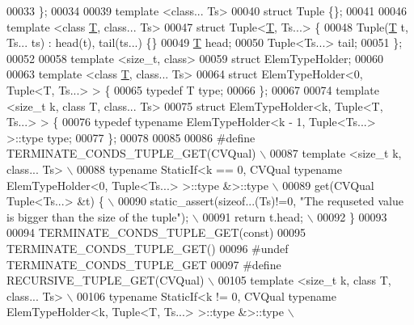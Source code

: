 \begin{DoxyCode}
00033 \};
00034 
00039 \textcolor{keyword}{template} <\textcolor{keyword}{class}... Ts>
00040 \textcolor{keyword}{struct }Tuple \{\};
00041 
00046 \textcolor{keyword}{template} <\textcolor{keyword}{class }\hyperlink{group___sparse_core___module_class_eigen_1_1_triplet}{T}, \textcolor{keyword}{class}... Ts>
00047 \textcolor{keyword}{struct }Tuple<\hyperlink{group___sparse_core___module_class_eigen_1_1_triplet}{T}, Ts...> \{
00048   Tuple(\hyperlink{group___sparse_core___module_class_eigen_1_1_triplet}{T} t, Ts... ts) : head(t), tail(ts...) \{\}
00049   \hyperlink{group___sparse_core___module_class_eigen_1_1_triplet}{T} head;
00050   Tuple<Ts...> tail;
00051 \};
00052 
00058 \textcolor{keyword}{template} <\textcolor{keywordtype}{size\_t}, \textcolor{keyword}{class}>
00059 \textcolor{keyword}{struct }ElemTypeHolder;
00060 
00063 \textcolor{keyword}{template} <\textcolor{keyword}{class }\hyperlink{group___sparse_core___module_class_eigen_1_1_triplet}{T}, \textcolor{keyword}{class}... Ts>
00064 \textcolor{keyword}{struct }ElemTypeHolder<0, Tuple<T, Ts...> > \{
00065   \textcolor{keyword}{typedef} T type;
00066 \};
00067 
00074 \textcolor{keyword}{template} <\textcolor{keywordtype}{size\_t} k, \textcolor{keyword}{class }T, \textcolor{keyword}{class}... Ts>
00075 \textcolor{keyword}{struct }ElemTypeHolder<k, Tuple<T, Ts...> > \{
00076   \textcolor{keyword}{typedef} \textcolor{keyword}{typename} ElemTypeHolder<k - 1, Tuple<Ts...> >::type type;
00077 \};
00078 
00085 
00086 \textcolor{preprocessor}{#define TERMINATE\_CONDS\_TUPLE\_GET(CVQual) \(\backslash\)}
00087 \textcolor{preprocessor}{template <size\_t k, class... Ts> \(\backslash\)}
00088 \textcolor{preprocessor}{typename StaticIf<k == 0, CVQual typename ElemTypeHolder<0, Tuple<Ts...> >::type &>::type \(\backslash\)}
00089 \textcolor{preprocessor}{get(CVQual Tuple<Ts...> &t) \{ \(\backslash\)}
00090 \textcolor{preprocessor}{  static\_assert(sizeof...(Ts)!=0, "The requseted value is bigger than the size of the tuple"); \(\backslash\)}
00091 \textcolor{preprocessor}{  return t.head; \(\backslash\)}
00092 \textcolor{preprocessor}{\}}
00093 
00094 TERMINATE\_CONDS\_TUPLE\_GET(\textcolor{keyword}{const})
00095 TERMINATE\_CONDS\_TUPLE\_GET()
00096 \textcolor{preprocessor}{#undef TERMINATE\_CONDS\_TUPLE\_GET}
00097 \textcolor{preprocessor}{#define RECURSIVE\_TUPLE\_GET(CVQual) \(\backslash\)}
00105 \textcolor{preprocessor}{template <size\_t k, class T, class... Ts> \(\backslash\)}
00106 \textcolor{preprocessor}{typename StaticIf<k != 0, CVQual typename ElemTypeHolder<k, Tuple<T, Ts...> >::type &>::type \(\backslash\)}

\end{DoxyCode}
